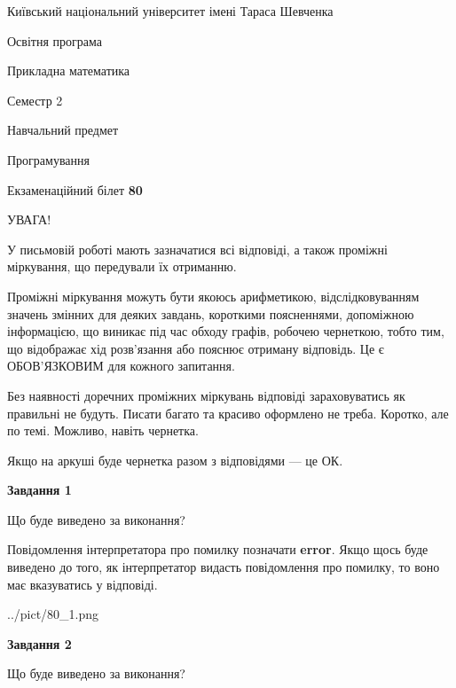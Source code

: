 \documentclass[12pt, ukrainian]{article}
\begin{document}
{{\begin {small}\par
{ \center  Київський національний університет імені Тараса Шевченка \par}
{\parbox {5 cm}{Освітня програма \hfill}{\parbox {7 cm}{Прикладна математика \hfill}}\parbox {6 cm}{\hfill Семестр 2}}\par
{\parbox {5 cm} {Навчальний предмет \hfill}\parbox {7 cm}{Програмування \hfill}\parbox {6cm}{\hfill}\par}\vspace{-7pt} \end{small}}{\center Екзаменаційний білет \No \textbf
{ 80 }\par}}
{
\begin {large}
УВАГА!

У письмовій роботі мають зазначатися всі відповіді, а також проміжні міркування, що передували їх отриманню.

Проміжні міркування можуть бути якоюсь арифметикою, відслідковуванням зна\-чень змінних для деяких завдань,
короткими поясненнями, допоміжною інформацією, що виникає під час обходу графів, робочею чернеткою,
тобто тим, що відображає хід розв’язання або пояснює отриману відповідь.
Це є ОБОВ’ЯЗКОВИМ для кожного запитання.

Без наявності доречних проміжних міркувань відповіді зараховуватись як правиль\-ні не будуть.
Писати багато та красиво оформлено не треба. Коротко, але по темі. Можли\-во, навіть чернетка.

Якщо на аркуші буде чернетка разом з відповідями --- це ОК.

\newpage

{\begin {center}\textbf{Завдання 1}\end {center}}\par
Що буде виведено за виконання?

Повідомлення інтерпретатора про помилку позначати \textbf{error}.
Якщо щось буде виведено до того, як інтерпретатор видасть повідомлення про помилку, 
то воно має вказуватись у відповіді. \par


\begin{center}
	{../pict/80_1.png}
\end{center}
\newpage

{\begin {center}\textbf{Завдання 2}\end {center}}\par
Що буде виведено за виконання?


\end{large}}
\end{document}

